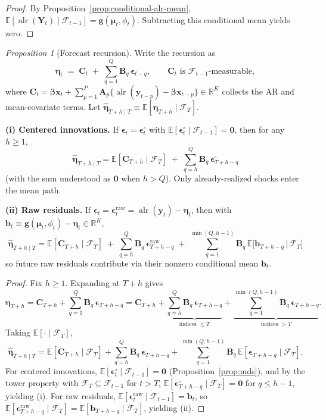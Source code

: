 \documentclass[12pt]{article}
\newcommand{\calF}{\mathcal{F}}
\theoremstyle{remark}
\newtheorem{prop}{Proposition}
\newcommand{\R}{\mathbb{R}}
\newcommand{\E}{\mathbb{E}}
\newcommand{\alr}{\operatorname{alr}}
\newcommand{\bfmu}{\boldsymbol{\mu}}
\newcommand{\bfeta}{\boldsymbol{\eta}}
\newcommand{\bfbeta}{\boldsymbol{\beta}}
\newcommand{\bfA}{\mathbf{A}}
\newcommand{\bfB}{\mathbf{B}}
\newcommand{\bfb}{\mathbf{b}}
\newcommand{\bfC}{\mathbf{C}}
\newcommand{\bfx}{\mathbf{x}}
\newcommand{\bfY}{\mathbf{Y}}
\newcommand{\bfy}{\mathbf{y}}
\begin{document}
\begin{proof}
By Proposition~\ref{prop:conditional-alr-mean}, $\E[\alr(\bfY_t)\mid\calF_{t-1}]=\mathbf{g}(\bfmu_t,\phi_t)$.
Subtracting this conditional mean yields zero.
\end{proof}

\begin{prop}[Forecast recursion]\label{prop:forecast}
Write the recursion as
\[
\bfeta_t \;=\; \bfC_t \;+\; \sum_{q=1}^{Q} \bfB_q\,\boldsymbol{\epsilon}_{t-q},
\qquad \bfC_t \text{ is } \calF_{t-1}\text{-measurable},
\]
where $\bfC_t=\bfbeta\bfx_t+\sum_{p=1}^P \bfA_p\{\alr(\bfy_{t-p})-\bfbeta\bfx_{t-p}\}\in\R^K$ collects the AR and mean-covariate terms.
Let $\widehat{\bfeta}_{T+h\mid T}\equiv \E[\bfeta_{T+h}\mid \calF_T]$.

\medskip
\noindent\textbf{(i) Centered innovations.}
If $\boldsymbol{\epsilon}_t=\boldsymbol{\epsilon}_t^{\circ}$ with $\E[\boldsymbol{\epsilon}_t^{\circ}\mid \calF_{t-1}]=\mathbf{0}$, then for any $h\ge 1$,
\[
\boxed{\;\widehat{\bfeta}_{T+h\mid T}
= \E[\bfC_{T+h}\mid \calF_T]
\;+\; \sum_{q=h}^{Q} \bfB_q\,\boldsymbol{\epsilon}_{T+h-q}^{\circ}\;}
\]
(with the sum understood as $\mathbf{0}$ when $h>Q$). Only already-realized shocks enter the mean path.

\medskip
\noindent\textbf{(ii) Raw residuals.}
If $\boldsymbol{\epsilon}_t=\boldsymbol{\epsilon}_t^{\mathrm{raw}}=\alr(\bfy_t)-\bfeta_t$, then with
$\bfb_t \equiv \mathbf{g}(\bfmu_t,\phi_t)-\bfeta_t\in\R^K$,
\[
\boxed{\;\widehat{\bfeta}_{T+h\mid T}
= \E[\bfC_{T+h}\mid \calF_T]
\;+\; \sum_{q=h}^{Q} \bfB_q\,\boldsymbol{\epsilon}_{T+h-q}^{\mathrm{raw}}
\;+\; \sum_{q=1}^{\min(Q,h-1)} \bfB_q\,\E\!\big[\bfb_{T+h-q}\,\big|\,\calF_T\big]\;}
\]
so future raw residuals contribute via their nonzero conditional mean $\bfb_t$.
\end{prop}

\begin{proof}
Fix $h\ge1$. Expanding at $T+h$ gives
\[
\bfeta_{T+h}
= \bfC_{T+h} + \sum_{q=1}^{Q} \bfB_q\,\boldsymbol{\epsilon}_{T+h-q}
= \bfC_{T+h}
+ \underbrace{\sum_{q=h}^{Q} \bfB_q\,\boldsymbol{\epsilon}_{T+h-q}}_{\text{indices }\le T}
+ \underbrace{\sum_{q=1}^{\min(Q,h-1)} \bfB_q\,\boldsymbol{\epsilon}_{T+h-q}}_{\text{indices }>T}.
\]
Taking $\E[\cdot\mid\calF_T]$,
\[
\widehat{\bfeta}_{T+h\mid T}=\E[\bfC_{T+h}\mid\calF_T]
+ \sum_{q=h}^{Q} \bfB_q\,\boldsymbol{\epsilon}_{T+h-q}
+ \sum_{q=1}^{\min(Q,h-1)} \bfB_q\,\E[\boldsymbol{\epsilon}_{T+h-q}\mid\calF_T].
\]
For centered innovations, $\E[\boldsymbol{\epsilon}_t^{\circ}\mid \calF_{t-1}]=\mathbf{0}$ (Proposition~\ref{prop:mds}),
and by the tower property with $\calF_T\subseteq \calF_{t-1}$ for $t>T$,
$\E[\boldsymbol{\epsilon}_{T+h-q}^{\circ}\mid \calF_T]=\mathbf{0}$ for $q\le h-1$, yielding (i).
For raw residuals, $\E[\boldsymbol{\epsilon}_t^{\mathrm{raw}}\mid \calF_{t-1}]=\bfb_t$,
so $\E[\boldsymbol{\epsilon}_{T+h-q}^{\mathrm{raw}}\mid \calF_T]
=\E[\bfb_{T+h-q}\mid \calF_T]$, yielding (ii).
\end{proof}
\end{document}
